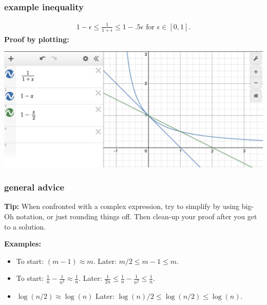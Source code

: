 \documentclass[handout,compress]{beamer}
\begin{document}
\begin{frame}
	\frametitle{example inequality}
	\begin{align*}
		1-\epsilon \leq \frac{1}{1+\epsilon} \leq 1 - .5\epsilon \text{ for } \epsilon \in [0,1].
	\end{align*}
	\textbf{Proof by plotting:}
	\begin{center}
		\includegraphics[width=\textwidth]{proof2.png}
	\end{center}
\end{frame}

\begin{frame} 
	\frametitle{general advice}
	\small
	\textbf{Tip:} When confronted with a complex expression, try to simplify by using big-Oh notation, or just rounding things off. Then clean-up your proof after you get to a solution.
	
	\textbf{Examples:}
	\begin{itemize}
		\item To start: $(m-1) \approx m$. \hspace{2.9em}Later: $m/2 \leq m-1 \leq m$. 
		\item To start: $\frac{1}{n} - \frac{1}{n^2} \approx \frac{1}{n}$. \hspace{3.5em}Later: $\frac{1}{2n} \leq \frac{1}{n} - \frac{1}{n^2} \leq \frac{1}{n}$.
		\item $\log(n/2)\approx \log(n)$
		\hspace{5em}Later: $\log(n)/2 \leq \log(n/2) \leq\log(n)$.
	\end{itemize}
\end{frame}
\end{document}
